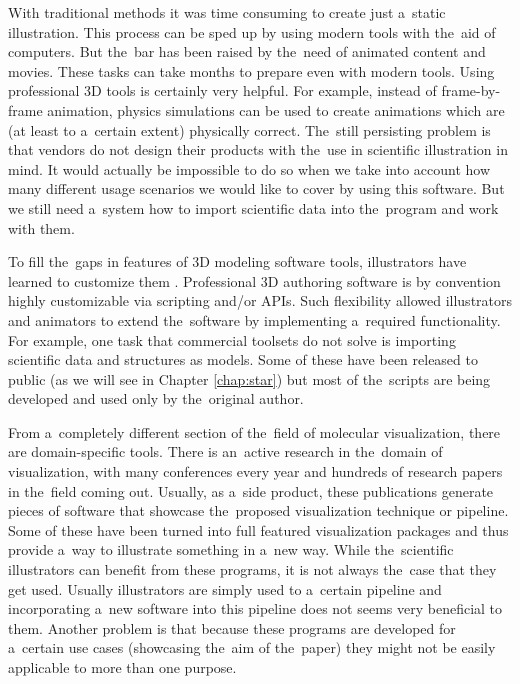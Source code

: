 \documentclass[
  digital, %
  table,   %
  nolof,     %
  nolot,     %
  oneside,
]{fithesis3}
\begin{document}
With traditional methods it was time consuming to create just a static illustration. This process can be sped up by using modern tools with the aid of computers. But the bar has been raised by the need of animated content and movies. These tasks can take months to prepare even with modern tools. Using professional 3D tools is certainly very helpful. For example, instead of frame-by-frame animation, physics simulations can be used to create animations which are (at least to a certain extent) physically correct. The still persisting problem is that vendors do not design their products with the use in scientific illustration in mind. It would actually be impossible to do so when we take into account how many different usage scenarios we would like to cover by using this software. But we still need a system how to import scientific data into the program and work with them.

To fill the gaps in features of 3D modeling software tools, illustrators have learned to customize them \cite{GrahamGaelInterview}. Professional 3D authoring software is by convention highly customizable via scripting and/or APIs. Such flexibility allowed illustrators and animators to extend the software by implementing a required functionality. For example, one task that commercial toolsets do not solve is importing scientific data and structures as models. Some of these have been released to public (as we will see in Chapter \ref{chap:star}) but most of the scripts are being developed and used only by the original author.

From a completely different section of the field of molecular visualization, there are domain-specific tools. There is an active research in the domain of visualization, with many conferences every year and hundreds of research papers in the field coming out. Usually, as a side product, these publications generate pieces of software that showcase the proposed visualization technique or pipeline. Some of these have been turned into full featured visualization packages and thus provide a way to illustrate something in a new way. While the scientific illustrators can benefit from these programs, it is not always the case that they get used. Usually illustrators are simply used to a certain pipeline and incorporating a new software into this pipeline does not seems very beneficial to them. Another problem is that because these programs are developed for a certain use cases (showcasing the aim of the paper) they might not be easily applicable to more than one purpose.
\end{document}
